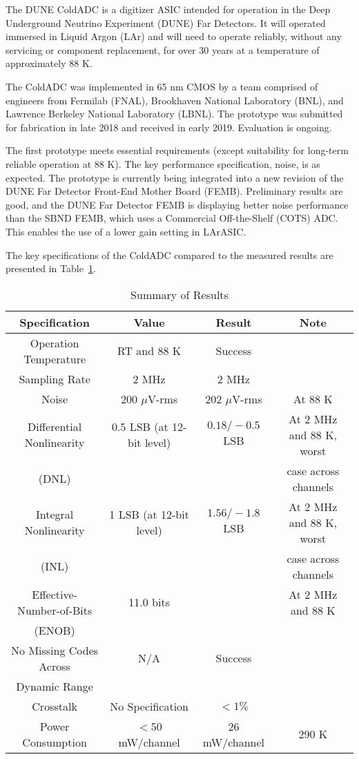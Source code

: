 \label{sec:1}

The DUNE ColdADC is a digitizer ASIC intended for operation in the Deep Underground Neutrino Experiment (DUNE) Far Detectors. It will operated immersed in Liquid Argon (LAr) and will need to operate reliably, without any servicing or component replacement, for over 30 years at a temperature of approximately 88 K. 

The ColdADC was implemented in 65 nm CMOS by a team comprised of engineers from Fermilab (FNAL), Brookhaven National Laboratory (BNL), and Lawrence Berkeley National Laboratory (LBNL). The prototype was submitted for fabrication in late 2018 and received in early 2019. Evaluation is ongoing. 

The first prototype meets essential requirements (except suitability for long-term reliable operation at 88 K). The key performance specification, noise, is as expected. The prototype is currently being integrated into a new revision of the DUNE Far Detector Front-End Mother Board (FEMB). Preliminary results are good, and the DUNE Far Detector FEMB is displaying better noise performance than the SBND FEMB, which uses a Commercial Off-the-Shelf (COTS) ADC. This enables the use of a lower gain setting in LArASIC.

The key specifications of the ColdADC compared to the measured results are presented in Table~\ref{tab:coldadc_specs}.

\begin{table}[h]
\centering
\begin{tabular}{|c|c|c|c|}
\hline
\textbf{ Specification } & \textbf{Value} & \textbf{Result} & \textbf{Note}  \\ \hline \hline
Operation Temperature &  RT and 88 K & Success & \\ \hline
Sampling Rate & 2 MHz & 2 MHz & \\ \hline
Noise & 200 $\mu$V-rms & 202 $\mu$V-rms & At 88 K \\ \hline
Differential Nonlinearity & 0.5 LSB (at 12-bit level) & $0.18/-0.5$ LSB & At 2 MHz and 88 K, worst \\
(DNL) & & & case across channels \\ \hline
Integral Nonlinearity & 1 LSB (at 12-bit level) & $1.56/-1.8$ LSB & At 2 MHz and 88 K, worst \\
(INL) & & & case across channels \\ \hline
Effective-Number-of-Bits & 11.0 bits & & At 2 MHz and 88 K \\ 
(ENOB) & & & \\ \hline
No Missing Codes Across & N/A & Success & \\ 
Dynamic Range & & & \\ \hline
Crosstalk  & No Specification & $<1\%$ & \\ \hline
Power Consumption & $<$50 mW/channel & 26 mW/channel & 290 K \\ \hline
\end{tabular}
\caption{Summary of Results}
\label{tab:coldadc_specs}
\end{table}
